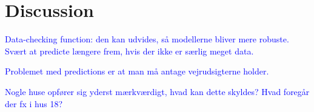 \chapter{Discussion}

\textcolor{blue}{Data-checking function: den kan udvides, så modellerne bliver mere robuste. Svært at predicte længere frem, hvis der ikke er særlig meget data.} 

\textcolor{blue}{Problemet med predictions er at man må antage vejrudsigterne holder.} 

\textcolor{blue}{Nogle huse opfører sig yderst mærkværdigt, hvad kan dette skyldes? Hvad foregår der fx i hus 18?}